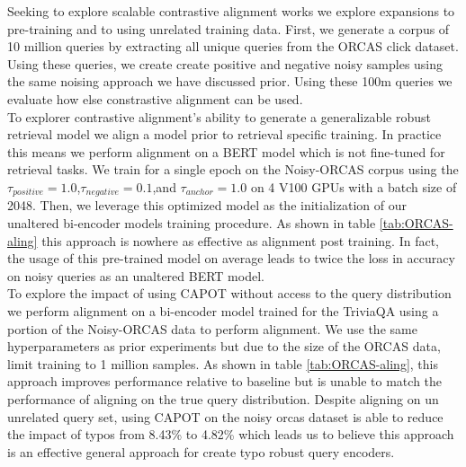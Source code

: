 Seeking to explore scalable contrastive alignment works we explore expansions to pre-training and to using unrelated training data. First, we generate a corpus of 10 million queries by extracting all unique queries from the ORCAS \cite{craswell2020ORCAS} click dataset. Using these queries, we create create positive and negative noisy samples using the same noising approach we have discussed prior. Using these 100m queries we evaluate how else constrastive alignment can be used. \\
To explorer contrastive alignment's ability to generate a generalizable robust retrieval model we align a model prior to retrieval specific training. In practice this means we perform alignment on a BERT model which is not fine-tuned for retrieval tasks. We train for a single epoch on the Noisy-ORCAS corpus using the $\tau_{positive}=1.0$,$\tau_{negative}=0.1$,and $\tau_{anchor}=1.0$ on 4 V100 GPUs with a batch size of 2048. Then, we leverage this optimized model as the initialization of our unaltered bi-encoder models training procedure. As shown in table \ref{tab:ORCAS-aling} this approach is nowhere as effective as alignment post training. In fact, the usage of this pre-trained model on average leads to twice the loss in accuracy on noisy queries as an unaltered BERT model.\\
To explore the impact of using CAPOT without access to the query distribution we perform alignment on a bi-encoder model trained for the TriviaQA using a portion of the Noisy-ORCAS data to perform alignment. We use the same hyperparameters as prior experiments but due to the size of the ORCAS data, limit training to 1 million samples. As shown in table \ref{tab:ORCAS-aling}, this approach improves performance relative to baseline but is unable to match the performance of aligning on the true query distribution. Despite aligning on un unrelated query set, using CAPOT on the noisy orcas dataset is able to reduce the impact of typos from 8.43\% to 4.82\% which leads us to believe this approach is an effective general approach for create typo robust query encoders. 
